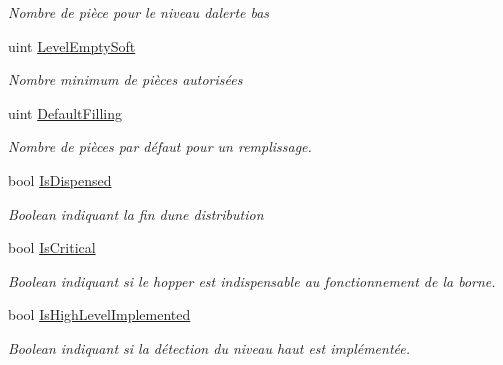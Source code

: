 \begin{DoxyCompactItemize}
\begin{DoxyCompactList}\small\item\em Nombre de pièce pour le niveau d\textquotesingle{}alerte bas \end{DoxyCompactList}\item 
uint \mbox{\hyperlink{class_device_library_1_1_c_hopper_aa319784d7be6861029637485981d5bc8}{Level\+Empty\+Soft}}
\begin{DoxyCompactList}\small\item\em Nombre minimum de pièces autorisées \end{DoxyCompactList}\item 
uint \mbox{\hyperlink{class_device_library_1_1_c_hopper_ad75b00a2bcc10f3340ffb6b3735bea7a}{Default\+Filling}}
\begin{DoxyCompactList}\small\item\em Nombre de pièces par défaut pour un remplissage. \end{DoxyCompactList}\item 
bool \mbox{\hyperlink{class_device_library_1_1_c_hopper_a1cb25d14b95a28dcd510b354b784a4ab}{Is\+Dispensed}}
\begin{DoxyCompactList}\small\item\em Boolean indiquant la fin d\textquotesingle{}une distribution \end{DoxyCompactList}\item 
bool \mbox{\hyperlink{class_device_library_1_1_c_hopper_a08a82f43af4ac242d87e2a73734d9159}{Is\+Critical}}
\begin{DoxyCompactList}\small\item\em Boolean indiquant si le hopper est indispensable au fonctionnement de la borne. \end{DoxyCompactList}\item 
bool \mbox{\hyperlink{class_device_library_1_1_c_hopper_a621e84f9419e3b7fd1c35f3f0a336a31}{Is\+High\+Level\+Implemented}}
\begin{DoxyCompactList}\small\item\em Boolean indiquant si la détection du niveau haut est implémentée. \end{DoxyCompactList}\item 

\end{DoxyCompactItemize}

